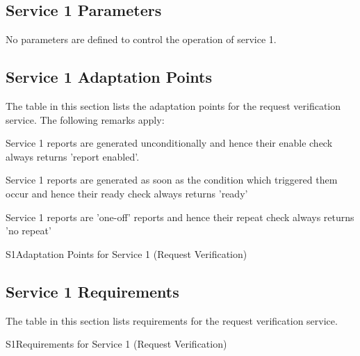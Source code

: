 \documentclass[a4paper,10pt]{article}
\newenvironment{fw_itemize}						%
{\begin{itemize}
  \setlength{\itemsep}{1mm}
  \setlength{\parskip}{0pt}
  \setlength{\parsep}{0pt}}
{\end{itemize}}
\newenvironment{cr_req}[2]
{
\begin{longtable}{|l|p{11.8cm}|}
\caption{#2}\label{tab:Req-#1} \\
\hline
\rowcolor{light-gray}
\textbf{Req. ID} & \textbf{Requirement Text}\\
\hline\hline
\endfirsthead
\rowcolor{light-gray}
\textbf{Req. ID} & \textbf{Requirement Text}\\
\hline\hline
\endhead
\DTLforeach*[\DTLiseq{\cat}{#1}]{dbReq}{\cat=Category,\type=Type,\id=Id,\reqText=Text}
{\DTLiffirstrow{}{\\\hline}P-\cat-\id/\type & \textit{\reqText}}\\\hline
}
{\end{longtable}}
\newenvironment{cr_ap}[2]
{
\begin{longtable}{|l|p{4.7cm}|p{6.9cm}|}
\caption{#2}\label{tab:AP-#1} \\
\hline
\rowcolor{light-gray}
\textbf{AP ID} & \textbf{Adaptation Point} & \textbf{Default Value}\\
\hline\hline
\endfirsthead
\rowcolor{light-gray}
\textbf{AP ID} & \textbf{Adaptation Point} & \textbf{Default Value}\\
\hline\hline
\endhead
\DTLforeach*[\DTLiseq{\cat}{#1}]{dbAP}{\cat=Category,\origin=Origin,\id=Id,\ap=AP,\defValue=DefValue}
{\DTLiffirstrow{}{\\\hline}P-\cat-\id & \ap (\origin) & \defValue}\\\hline
}
{\end{longtable}}
\begin{document}
\subsection{Service 1 Parameters}\label{sec:serv1Par}
No parameters are defined to control the operation of service 1.


\subsection{Service 1 Adaptation Points}\label{sec:serv1AP}
The table in this section lists the adaptation points for the request verification service. The following remarks apply: 

\begin{fw_itemize}
\item Service 1 reports are generated unconditionally and hence their enable check always returns 'report enabled'.
\item Service 1 reports are generated as soon as the condition which triggered them occur and hence their ready check always returns 'ready'
\item Service 1 reports are 'one-off' reports and hence their repeat check always returns 'no repeat'
\end{fw_itemize}

\begin{cr_ap}{S1}{Adaptation Points for Service 1 (Request Verification)}
\end{cr_ap}


\subsection{Service 1 Requirements}
The table in this section lists requirements for the request verification service.

\begin{cr_req}{S1}{Requirements for Service 1 (Request Verification)}
\end{cr_req}
\end{document}
